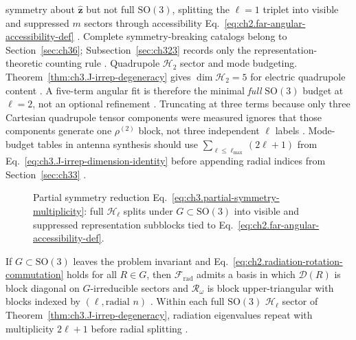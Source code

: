 symmetry about \(\hat{\mathbf{z}}\) but not full \(\mathrm{SO}(3)\), splitting the \(\ell=1\)
triplet into visible and suppressed \(m\) sectors through accessibility
Eq.~\eqref{eq:ch2.far-angular-accessibility-def} \cite{harrington2001}. Complete
symmetry-breaking catalogs belong to Section~\ref{sec:ch36}; Subsection~\ref{sec:ch323} records only
the representation-theoretic counting rule \cite{hansen1988}.
Quadrupole \(\mathcal{H}_{2}\) sector and mode budgeting. Theorem~\ref{thm:ch3.J-irrep-degeneracy} gives \(\dim\mathcal{H}_{2}=5\) for electric quadrupole content
\cite{jackson1999}. A five-term angular fit is therefore the minimal \emph{full} \(\mathrm{SO}(3)\)
budget at \(\ell=2\), not an optional refinement \cite{hansen1988}. Truncating at three terms
because only three Cartesian quadrupole tensor components were measured ignores that those components generate
one \(\rho^{(2)}\) block, not three independent \(\ell\) labels \cite{harrington2001}. Mode-budget tables in
antenna synthesis should use \(\sum_{\ell\le\ell_{\max}}(2\ell+1)\) from
Eq.~\eqref{eq:ch3.J-irrep-dimension-identity} before appending radial indices from Section~\ref{sec:ch33}
\cite{hansen1988}.
\begin{figure}[t]
\centering
{}
\caption{Partial symmetry reduction Eq.~\eqref{eq:ch3.partial-symmetry-multiplicity}: full
\(\mathcal{H}_{\ell}\) splits under \(G\subset\mathrm{SO}(3)\) into visible and suppressed representation
subblocks tied to Eq.~\eqref{eq:ch2.far-angular-accessibility-def}.}
\label{fig:ch3.partial-symmetry-split}
\end{figure}
\begin{proposition}
\label{prop:ch3.simultaneous-block-diagonalization}
If \(G\subset\mathrm{SO}(3)\) leaves the problem invariant and
Eq.~\eqref{eq:ch2.radiation-rotation-commutation} holds for all \(R\in G\), then
\(\mathcal{F}_{\mathrm{rad}}\) admits a basis in which \(\mathcal{D}(R)\) is block diagonal on
\(G\)-irreducible sectors and \(\mathcal{R}_\omega\) is block upper-triangular with blocks indexed by
\((\ell,\text{radial }n)\) \cite{stratton1941}. Within each full \(\mathrm{SO}(3)\)
\(\mathcal{H}_{\ell}\) sector of Theorem~\ref{thm:ch3.J-irrep-degeneracy}, radiation eigenvalues repeat
with multiplicity \(2\ell+1\) before radial splitting \cite{hansen1988}.
\end{proposition}
